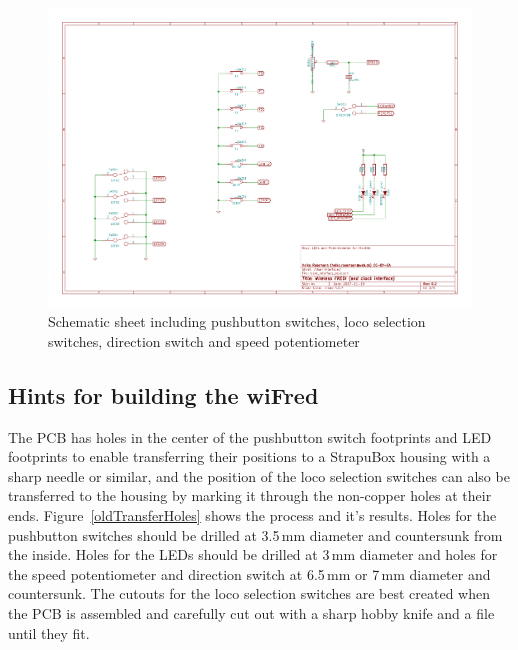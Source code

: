 \documentclass[11pt,a4paper]{scrartcl}
\begin{document}
\begin{figure}[tbh]
  \centering
  \includegraphics[width=\textwidth]{images/old_User_interface_rev2-User_Interface}
  \caption{Schematic sheet including pushbutton switches, loco selection switches, direction switch and speed potentiometer}
  \label{oldSchematicPage4}
\end{figure}

\subsection{Hints for building the wiFred}

The PCB has holes in the center of the pushbutton switch footprints and LED footprints to enable transferring their positions to a StrapuBox housing with a sharp needle or similar, and the position of the loco selection switches can also be transferred to the housing by marking it through the non-copper holes at their ends. Figure~\ref{oldTransferHoles} shows the process and it's results. Holes for the pushbutton switches should be drilled at 3.5\,mm diameter and countersunk from the inside. Holes for the LEDs should be drilled at 3\,mm diameter and holes for the speed potentiometer and direction switch at 6.5\,mm or 7\,mm diameter and countersunk. The cutouts for the loco selection switches are best created when the PCB is assembled and carefully cut out with a sharp hobby knife and a file until they fit.
\end{document}
